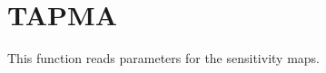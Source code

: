 \section{TAPMA}
\label{sect:tapma}

\noindent This function reads parameters for the sensitivity maps.\\
